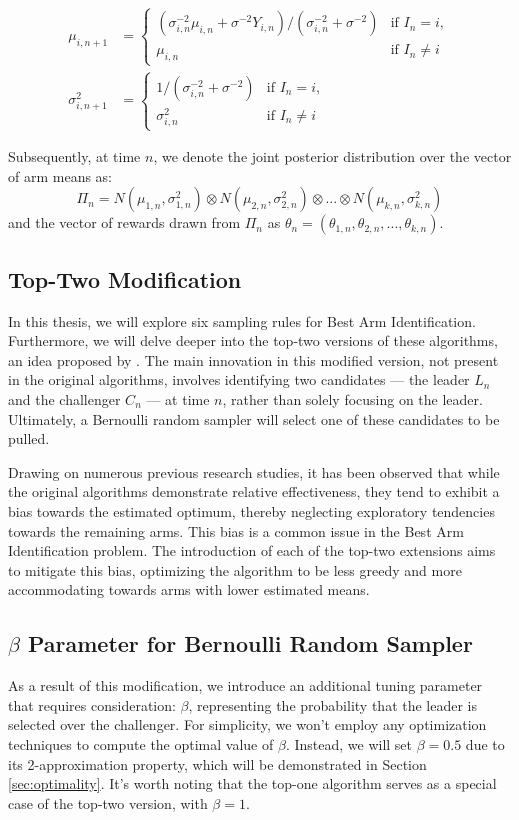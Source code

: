 \documentclass[a4paper, 12pt]{article}
\theoremstyle{definition}
\begin{document}
\begin{align} 
\mu_{i,n+1} &=
\begin{cases} \label{eq:miu_update}
    (\sigma_{i,n}^{-2} \mu_{i,n} + \sigma^{-2} Y_{i,n}) / (\sigma_{i,n}^{-2} + \sigma^{-2}) & \text{if } I_n = i, \\
    \mu_{i,n} & \text{if } I_n \neq i
\end{cases} \\
\sigma_{i,n+1}^2 &=
\begin{cases} \label{eq:sigma_update}
    1 / (\sigma_{i,n}^{-2} + \sigma^{-2}) & \text{if } I_n = i, \\
    \sigma_{i,n}^2 & \text{if } I_n \neq i
\end{cases}
\end{align}

Subsequently, at time $n$, we denote the joint posterior distribution over the vector of arm means as:
\[\Pi_n = N(\mu_{1,n},\sigma_{1,n}^2) \otimes N(\mu_{2,n},\sigma_{2,n}^2) \otimes ... \otimes N(\mu_{k,n},\sigma_{k,n}^2)\]
and the vector of rewards drawn from $\Pi_n$ as $\theta_n = (\theta_{1,n},\theta_{2,n}, ..., \theta_{k,n})$.


\subsection{Top-Two Modification} 
In this thesis, we will explore six sampling rules for Best Arm Identification. Furthermore, we will delve deeper into the top-two versions of these algorithms, an idea proposed by \cite{toptwo}. The main innovation in this modified version, not present in the original algorithms, involves identifying two candidates — the leader $L_n$ and the challenger $C_n$ — at time $n$, rather than solely focusing on the leader. Ultimately, a Bernoulli random sampler will select one of these candidates to be pulled.

Drawing on numerous previous research studies, it has been observed that while the original algorithms demonstrate relative effectiveness, they tend to exhibit a bias towards the estimated optimum, thereby neglecting exploratory tendencies towards the remaining arms. This bias is a common issue in the Best Arm Identification problem. The introduction of each of the top-two extensions aims to mitigate this bias, optimizing the algorithm to be less greedy and more accommodating towards arms with lower estimated means.


\subsection{$\beta$ Parameter for Bernoulli Random Sampler}
As a result of this modification, we introduce an additional tuning parameter that requires consideration: $\beta$, representing the probability that the leader is selected over the challenger. For simplicity, we won't employ any optimization techniques to compute the optimal value of $\beta$. Instead, we will set $\beta = 0.5$ due to its 2-approximation property, which will be demonstrated in Section \ref{sec:optimality}. It's worth noting that the top-one algorithm serves as a special case of the top-two version, with $\beta = 1$.
\end{document}
